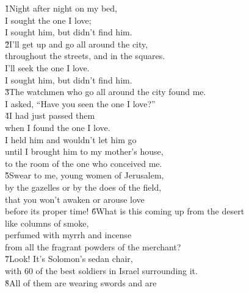 \begin{poetry}
\poeml {}
\v{1}Night after night on my bed, \\
\poeml I sought the one I love; \\
\poeml I sought him, but didn't find him. \\
\poeml \v{2}I'll get up and go all around the city, \\
\poemll    throughout the streets, and in the squares. \\
\poeml I'll seek the one I love. \\
\poemll    I sought him, but didn't find him. \\
\poeml \v{3}The watchmen who go all around the city found me. \\
\poemll    I asked, ``Have you seen the one I love?'' \\
\poeml \v{4}I had just passed them \\
\poemll    when I found the one I love. \\
\poeml I held him and wouldn't let him go \\
\poemll    until I brought him to my mother's house, \\
\poemlll       to the room of the one who conceived me. \\
\poeml \v{5}Swear to me, young women of Jerusalem, \\
\poemll    by the gazelles or by the does of the field, \\
\poeml that you won't awaken or arouse love \\
\poemll    before its proper time!
\poeml \v{6}What is this coming up from the desert \\
\poemll    like columns of smoke, \\
\poeml perfumed with myrrh and incense \\
\poemll    from all the fragrant powders of the merchant? \\
\poeml \v{7}Look! It's Solomon's sedan chair, \\
\poemll    with 60 of the best soldiers in Israel surrounding it. \\
\poeml \v{8}All of them are wearing swords and are \\

\end{poetry}
